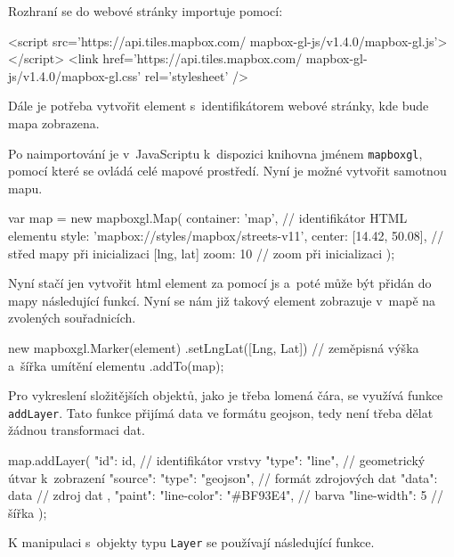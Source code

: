 \bigbreak


Rozhraní se do webové stránky importuje pomocí:


\begin{code}[frame=none]
<script src='https://api.tiles.mapbox.com/
  mapbox-gl-js/v1.4.0/mapbox-gl.js'></script>
<link href='https://api.tiles.mapbox.com/
  mapbox-gl-js/v1.4.0/mapbox-gl.css' rel='stylesheet' />
\end{code}


\bigbreak


Dále je potřeba vytvořit element s~identifikátorem webové stránky, kde bude mapa zobrazena.


\bigbreak


Po naimportování je v~JavaScriptu k~dispozici knihovna jménem \verb-mapboxgl-, pomocí které se ovládá celé mapové prostředí. Nyní je možné vytvořit samotnou mapu.


\begin{code}[frame=none]
var map = new mapboxgl.Map({
  container: 'map', // identifikátor HTML elementu
  style: 'mapbox://styles/mapbox/streets-v11',
  center: [14.42, 50.08], // střed mapy při inicializaci [lng, lat]
    zoom: 10 // zoom při inicializaci
});
\end{code}


Nyní stačí jen vytvořit \gls{html} element za pomocí \gls{js} a~poté může být přidán do mapy následující funkcí. Nyní se nám již takový element zobrazuje v~mapě na zvolených souřadnicích.


\begin{code}[frame=none]
new mapboxgl.Marker(element)
  .setLngLat([Lng, Lat]) // zeměpisná výška a~šířka
    umítění elementu
  .addTo(map);
\end{code}


Pro vykreslení složitějších objektů, jako je třeba lomená čára, se využívá funkce \verb-addLayer-. Tato funkce přijímá data ve formátu \gls{geojson}, tedy není třeba dělat žádnou transformaci dat.


\begin{code}[frame=none]
map.addLayer({
  "id": id, // identifikátor vrstvy
  "type": "line", // geometrický útvar k~zobrazení
  "source": {
    "type": "geojson", // formát zdrojových dat
    "data": data // zdroj dat
  },
  "paint": {
    "line-color": "#BF93E4", // barva
    "line-width": 5 // šířka
  }
});
\end{code}


K manipulaci s~objekty typu \verb-Layer- se používají následující funkce.


